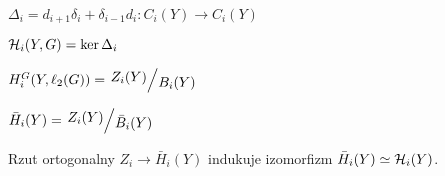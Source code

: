 \begin{definicja}[laplasjan]
	$\Delta_i = d_{i+1} \delta_i + \delta_{i-1} d_i : C_i(Y) \to C_i(Y)$
\end{definicja}

\begin{stwierdzenie}
	${\mathcal{H}}_i(Y, G) = \ker \Delta_i$
\end{stwierdzenie}

\begin{twierdzenie}
	$H_i^G(Y, \ell_2(G)) = \bigslant{Z_i(Y)}{B_i(Y)}$
\end{twierdzenie}

\begin{definicja}
	$\bar{H}_i(Y) = \bigslant{Z_i(Y)}{\bar{B}_i(Y)}$
\end{definicja}

\begin{stwierdzenie}
	Rzut ortogonalny $Z_i \to \bar{H}_i(Y)$ indukuje 
	izomorfizm $\bar{H}_i(Y) \simeq {\mathcal{H}}_i(Y)$.
\end{stwierdzenie}













